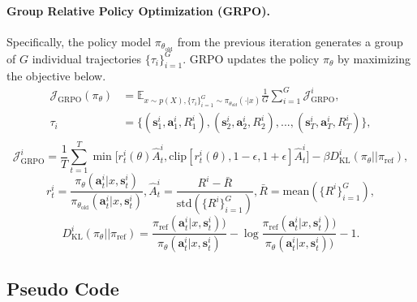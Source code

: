 \documentclass[]{youtu} %
\begin{document}
\paragraph{Group Relative Policy Optimization (GRPO).}
Specifically,
the policy model $\pi_{\theta_{\text{old}}}$ from the previous iteration generates a group of $G$ individual trajectories $\{\tau_{i}\}_{i=1}^{G}$.
GRPO updates the policy $\pi_{\theta}$ by maximizing the objective below.
\begin{equation}\label{eq:grpo_all}
\begin{aligned}
    \mathcal{J}_{\text{GRPO}}(\pi_\theta)&=
     \mathbb{E}_{x\sim p(X), \{\tau_{i}\}_{i=1}^{G}\sim \pi_{\theta_{old}}(\cdot|x)}\frac{1}{G}\sum_{i=1}^{G}\mathcal{J}_{\text{GRPO}}^{i},\\
     \tau_{i}&=\{(\mathbf{s}_1^{i}, \mathbf{a}_1^{i}, R_1^{i}), (\mathbf{s}_2^{i}, \mathbf{a}_2^{i}, R_2^{i}),...,(\mathbf{s}_{T}^{i}, \mathbf{a}_{T}^{i}, R_{T}^{i})\},\\
\end{aligned}
\end{equation}
\begin{equation}\label{eq:grpo_vanilla}
    \mathcal{J}_{\text{GRPO}}^{i}=
    \frac{1}{T}\sum_{t=1}^{T}\min\Biggr[r^{i}_{t}(\theta)\hat{A}^{i}_{t}, \text{clip}[r^{i}_{t}(\theta), 1-\epsilon, 1+\epsilon]\hat{A}^{i}_{t}\Biggr]-
    \beta D_{\text{KL}}^{i}(\pi_{\theta}||\pi_{\text{ref}}),
\end{equation}
\begin{equation}\label{eq:adv_vanilla}
    r^{i}_{t}=\frac{\pi_{\theta}(\mathbf{a}^{i}_{t}|x,\mathbf{s}^{i}_{t})}{\pi_{\theta_{\text{old}}}(\mathbf{a}^{i}_{t}|x,\mathbf{s}^{i}_{t})},
    \hat{A}^{i}_{t}=\frac{R^{i}-\bar{R}}{\text{std}(\{R^{i}\}_{i=1}^{G})},\bar{R}=\text{mean}(\{R^{i}\}_{i=1}^{G}),
\end{equation}
\begin{equation}\label{eq:kl}
    D_{\text{KL}}^{i}(\pi_{\theta}||\pi_{\text{ref}})=\frac{\pi_{\text{ref}}(\mathbf{a}^{i}_{t}|x,\mathbf{s}^{i}_{t}))}{\pi_{\theta}(\mathbf{a}^{i}_{t}|x,\mathbf{s}^{i}_{t})}-\log\frac{\pi_{\text{ref}}(\mathbf{a}^{i}_{t}|x,\mathbf{s}^{i}_{t}))}{\pi_{\theta}(\mathbf{a}^{i}_{t}|x,\mathbf{s}^{i}_{t}))}-1.
\end{equation}





\subsection{Pseudo Code}
\label{sec:pseudocode}
\end{document}
